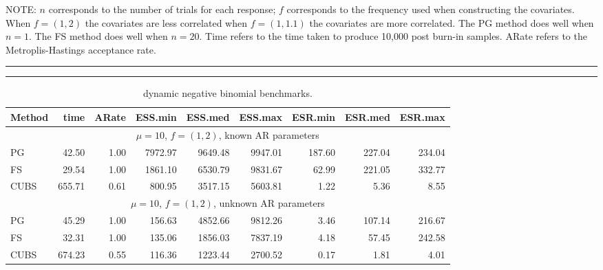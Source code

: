 \documentclass[12pt]{article}
\begin{document}
\begin{table}
  NOTE: $n$ corresponds to the number of trials for each response; $f$ corresponds
  to the frequency used when constructing the covariates.  When $f = (1,2)$ the
  covariates are less correlated when $f=(1,1.1)$ the covariates are more
  correlated.  The PG method does well when $n=1$.  The FS method does well when
  $n=20$.  Time refers to the time taken to produce 10,000 post burn-in samples.
  ARate refers to the Metroplis-Hastings acceptance rate.
\end{table}


\begin{table}

  \begin{center}
    \caption{\label{tab:dynnb-detail} dynamic negative binomial benchmarks.}
    \hrule
    \vspace{2pt}
    \hrule
  \end{center}

  \begin{center}
    \small
    \begin{tabular}{l r r r r r r r r }
      Method  &    time  &   ARate  &  ESS.min  &  ESS.med  &  ESS.max  &  ESR.min  & ESR.med  &  ESR.max \\
      \hline

      \multicolumn{9}{c}{$\mu=10$, $f = (1,2)$, known AR parameters} \\
      PG   &    42.50 &     1.00 &   7972.97 &   9649.48 &   9947.01 &    187.60 &    227.04 &    234.04 \\
      FS   &    29.54 &     1.00 &   1861.10 &   6530.79 &   9831.67 &     62.99 &    221.05 &    332.77 \\
      CUBS   &   655.71 &     0.61 &    800.95 &   3517.15 &   5603.81 &      1.22 &      5.36 &      8.55
      \\ %

      \multicolumn{9}{c}{$\mu=10$, $f = (1,2)$, unknown AR parameters} \\
      PG   &    45.29 &     1.00 &    156.63 &   4852.66 &   9812.26 &      3.46 &    107.14 &    216.67 \\
      FS   &    32.31 &     1.00 &    135.06 &   1856.03 &   7837.19 &      4.18 &     57.45 &    242.58 \\
      CUBS   &   674.23 &     0.55 &    116.36 &   1223.44 &   2700.52 &      0.17 &      1.81 &      4.01
      \\ %


\end{tabular}
\end{center}
\end{table}
\end{document}
